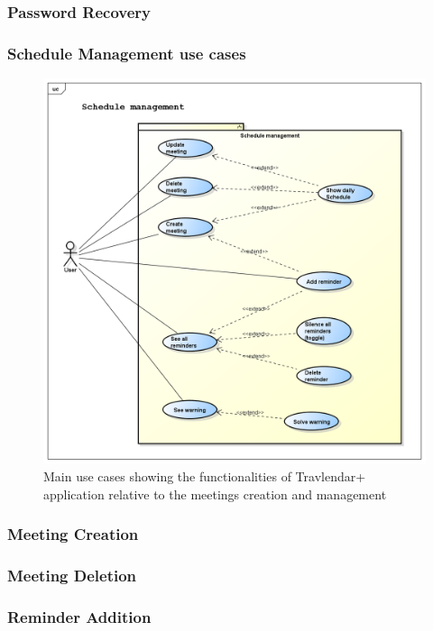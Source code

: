 \subsubsection{Password Recovery}



\newpage
\subsubsection{Schedule Management use cases}
\begin{figure}[htp] 
\includegraphics[width=\textwidth]{usecases/png/schedulemanagement} 
\caption{Main use cases showing the functionalities of Travlendar+ application relative to the meetings creation and management} 
\label{fig:schedulemanagement} 
\end{figure}

\newpage
\subsubsection{Meeting Creation}

\newpage
\subsubsection{Meeting Deletion}

\newpage
\subsubsection{Reminder Addition}

\newpage
